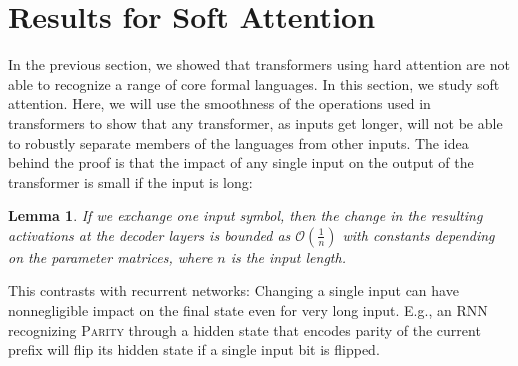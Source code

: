 \documentclass[11pt,a4paper]{article}
\newcounter{theorem}
\newtheorem{lemma}[theorem]{Lemma}
\begin{document}




\section{Results for Soft Attention}\label{sec:soft}



In the previous section, we showed that transformers using hard attention are not able to recognize a range of core formal languages.
In this section, we study soft attention. %
Here, we will use the smoothness of the operations used in transformers to show that any transformer, as inputs get longer, will not be able to robustly separate members of the languages from other inputs.
The idea behind the proof is that the impact of any single input on the output of the transformer is small if the input is long:
\begin{lemma}
If we exchange one input symbol, %
then the change in the resulting activations at the decoder layers is bounded as $\mathcal{O}(\frac{1}{n})$ with constants depending on the parameter matrices, where $n$ is the input length. %
\end{lemma}
This contrasts with recurrent networks:
Changing a single input can have nonnegligible impact on the final state even for very long input.
E.g., an RNN recognizing \textsc{Parity} through a hidden state that encodes parity of the current prefix will flip its hidden state if a single input bit is flipped.
\end{document}
